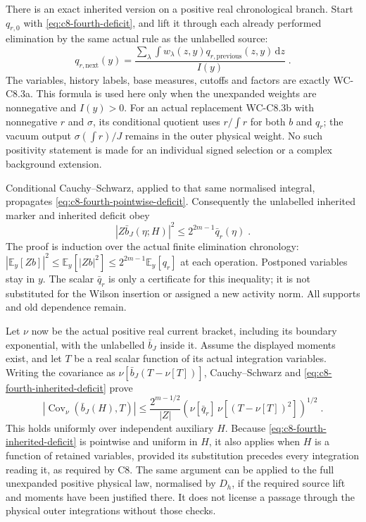 \documentclass[11pt]{article}
\newcommand{\dd}{\mathrm{d}}
\begin{document}
There is an exact inherited version on a positive real chronological
branch. Start $q_{r,0}$ with \eqref{eq:c8-fourth-deficit}, and lift it
through each already performed elimination by the same actual rule
as the unlabelled source:
\begin{equation}\label{eq:c8-fourth-deficit-lift}
    q_{r,\mathrm{next}}(y)=
        \frac{\sum_\lambda\int
            w_\lambda(z,y)q_{r,\mathrm{previous}}(z,y)\,\dd z}
             {I(y)}\;.
\end{equation}
The variables, history labels, base measures, cutoffs and factors are
exactly WC-C8.3a. This formula is used here only when the unexpanded
weights are nonnegative and $I(y)>0$. For an actual replacement
WC-C8.3b with nonnegative $r$ and $\sigma$, its conditional quotient
uses $r/\int r$ for both $b$ and $q_r$; the vacuum output
$\sigma(\int r)/J$ remains in the outer physical weight. No such
positivity statement is made for an individual signed selection or
a complex background extension.

Conditional Cauchy--Schwarz, applied to that same normalised integral,
propagates \eqref{eq:c8-fourth-pointwise-deficit}. Consequently the
unlabelled inherited marker and inherited deficit obey
\begin{equation}\label{eq:c8-fourth-inherited-deficit}
    |Z\bar b_J(\eta;H)|^2
        \leq2^{2m-1}\bar q_r(\eta)\;.
\end{equation}
The proof is induction over the actual finite elimination chronology:
$|\mathbb E_y[Zb]|^2\leq\mathbb E_y[|Zb|^2]
\leq2^{2m-1}\mathbb E_y[q_r]$ at each operation. Postponed variables
stay in $y$. The scalar $\bar q_r$ is only a certificate for this
inequality; it is not substituted for the Wilson insertion or
assigned a new activity norm. All supports and old dependence remain.

Let $\nu$ now be the actual positive real current bracket, including
its boundary exponential, with the unlabelled $\bar b_J$ inside it.
Assume the displayed moments exist, and let $T$ be a real scalar
function of its actual integration variables. Writing the covariance
as $\nu[\bar b_J(T-\nu[T])]$, Cauchy--Schwarz and
\eqref{eq:c8-fourth-inherited-deficit} prove
\begin{equation}\label{eq:c8-fourth-deficit-covariance}
    |\operatorname{Cov}_\nu(\bar b_J(H),T)|
        \leq\frac{2^{m-1/2}}{|Z|}
            \left(\nu[\bar q_r]\,
                \nu[(T-\nu[T])^2]\right)^{1/2}\;.
\end{equation}
This holds uniformly over independent auxiliary $H$. Because
\eqref{eq:c8-fourth-inherited-deficit} is pointwise and uniform in
$H$, it also applies when $H$ is a function of retained variables,
provided its substitution precedes every integration reading it,
as required by C8. The same argument can be applied to the full
unexpanded positive physical law, normalised by $D_h$, if the required
source lift and moments have been justified there. It does not license
a passage through the physical outer integrations without those checks.
\end{document}

